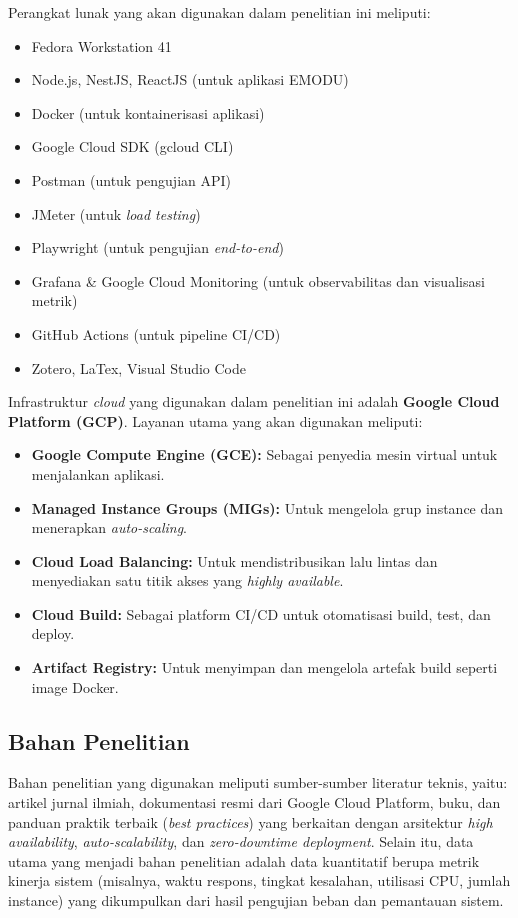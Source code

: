 \hspace{-32pt} Perangkat lunak yang akan digunakan dalam penelitian ini meliputi:
\begin{itemize}
  \item Fedora Workstation 41
  \item Node.js, NestJS, ReactJS (untuk aplikasi EMODU)
  \item Docker (untuk kontainerisasi aplikasi)
  \item Google Cloud SDK (gcloud CLI)
  \item Postman (untuk pengujian API)
  \item JMeter (untuk \textit{load testing})
  \item Playwright (untuk pengujian \textit{end-to-end})
  \item Grafana \& Google Cloud Monitoring (untuk observabilitas dan visualisasi metrik)
  \item GitHub Actions (untuk pipeline CI/CD)
  \item Zotero, LaTex, Visual Studio Code
\end{itemize}

\hspace{-32pt} Infrastruktur \textit{cloud} yang digunakan dalam penelitian ini adalah \textbf{Google Cloud Platform (GCP)}. Layanan utama yang akan digunakan meliputi:
\begin{itemize}
  \item \textbf{Google Compute Engine (GCE):} Sebagai penyedia mesin virtual untuk menjalankan aplikasi.
  \item \textbf{Managed Instance Groups (MIGs):} Untuk mengelola grup instance dan menerapkan \textit{auto-scaling}.
  \item \textbf{Cloud Load Balancing:} Untuk mendistribusikan lalu lintas dan menyediakan satu titik akses yang \textit{highly available}.
  \item \textbf{Cloud Build:} Sebagai platform CI/CD untuk otomatisasi build, test, dan deploy.
  \item \textbf{Artifact Registry:} Untuk menyimpan dan mengelola artefak build seperti image Docker.
\end{itemize}

\subsection{Bahan Penelitian}
Bahan penelitian yang digunakan meliputi sumber-sumber literatur teknis, yaitu: artikel jurnal ilmiah, dokumentasi resmi dari Google Cloud Platform, buku, dan panduan praktik terbaik (\textit{best practices}) yang berkaitan dengan arsitektur \textit{high availability}, \textit{auto-scalability}, dan \textit{zero-downtime deployment}.
Selain itu, data utama yang menjadi bahan penelitian adalah data kuantitatif berupa metrik kinerja sistem (misalnya, waktu respons, tingkat kesalahan, utilisasi CPU, jumlah instance) yang dikumpulkan dari hasil pengujian beban dan pemantauan sistem.

